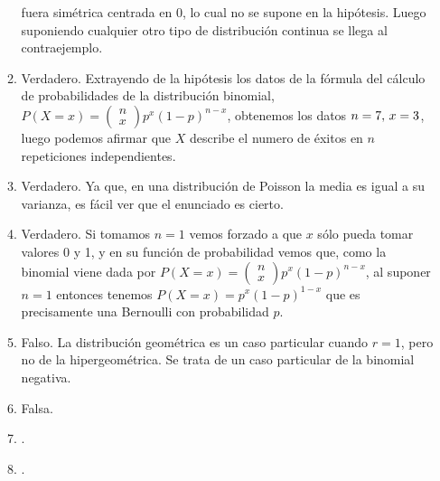 \documentclass[fleqn]{article}
\begin{document}
\begin{enumerate}
\begin{enumerate}
                                        fuera simétrica centrada en 0, lo cual no se supone en la hipótesis. Luego suponiendo cualquier otro tipo de distribución continua se llega al 
                                        contraejemplo.\\
                                \item Verdadero. Extrayendo de la hipótesis los datos de la fórmula del cálculo de probabilidades de la distribución binomial,
                                        $P(X=x) = \left(\begin{matrix} n \\ x \end{matrix}\right) p^x (1-p)^{n-x}$, obtenemos los datos $n=7, \thinspace x=3$, 
                                        luego podemos afirmar que $X$ describe el numero de éxitos en $n$ repeticiones independientes.\\
                                \item Verdadero. Ya que, en una distribución de Poisson la media es igual a su varianza, es fácil ver que el enunciado es cierto.\\
                                \item Verdadero. Si tomamos $n=1$ vemos forzado a que $x$ sólo pueda tomar valores 0 y 1, y en su función de probabilidad vemos que, como 
                                        la binomial viene dada por $P(X=x) = \left(\begin{matrix} n \\ x \end{matrix}\right) p^x (1-p)^{n-x}$, al suponer
                                        $n=1$ entonces tenemos $P(X=x) = p^x (1-p)^{1-x}$ que es precisamente una Bernoulli con probabilidad $p$.\\
                                \item Falso. La distribución geométrica es un caso particular cuando $r=1$, pero no de la hipergeométrica. Se trata de un caso particular
                                        de la binomial negativa.
                                \item Falsa.
                                \item .
                                \item .
                                
                        \end{enumerate}

                
                \newpage
                

\end{enumerate}
\end{document}
